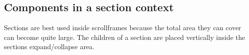 %
%

\subsection{Components in a section context}
Sections are best used inside scrollframes because the total area they can
cover can become quite large. The children of a section are placed vertically
inside the sections expand/collapse area.

